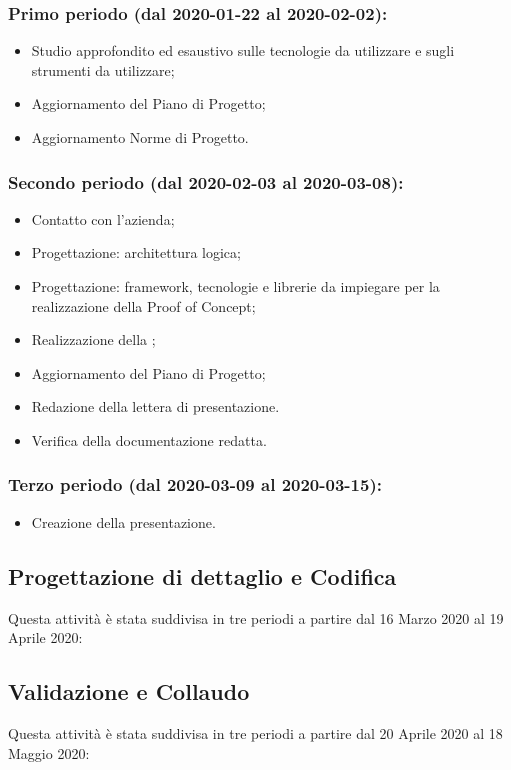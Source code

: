 		\subsubsection{Primo periodo (dal 2020-01-22 al 2020-02-02):}
			\begin{itemize}
			 	\item Studio approfondito ed esaustivo sulle tecnologie da utilizzare e sugli strumenti da utilizzare;
			 	\item Aggiornamento del Piano di Progetto;
			 	\item Aggiornamento Norme di Progetto.
			\end{itemize} 	
		
		\subsubsection{Secondo periodo (dal 2020-02-03 al 2020-03-08):}
			\begin{itemize}
				\item Contatto con l'azienda;
				\item Progettazione: architettura logica;
				\item Progettazione: framework, tecnologie e librerie da impiegare per la realizzazione della Proof of Concept;
				\item Realizzazione della ;
				\item Aggiornamento del Piano di Progetto;
				\item Redazione della lettera di presentazione.
				\item Verifica della documentazione redatta.
			\end{itemize}

		\subsubsection{Terzo periodo (dal 2020-03-09 al 2020-03-15):}
			\begin{itemize}
				\item Creazione della presentazione.
			\end{itemize}

	\subsection{Progettazione di dettaglio e Codifica}
	Questa attività è stata suddivisa in tre periodi a partire dal 16 Marzo 2020 al 19 Aprile 2020:

	
	\subsection{Validazione e Collaudo}		
	Questa attività è stata suddivisa in tre periodi a partire dal 20 Aprile 2020 al 18 Maggio 2020:


